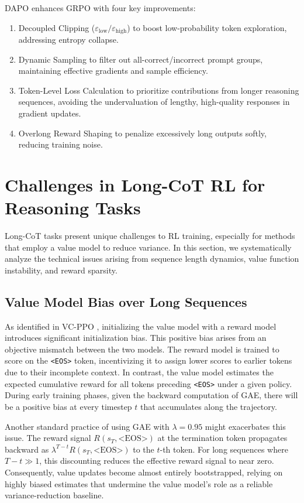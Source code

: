 DAPO enhances GRPO with four key improvements:  
\begin{enumerate}
\item  Decoupled Clipping (\(\varepsilon_{\text{low}}/\varepsilon_{\text{high}}\)) to boost low-probability token exploration, addressing entropy collapse.  
\item Dynamic Sampling to filter out all-correct/incorrect prompt groups, maintaining effective gradients and sample efficiency.  
\item  Token-Level Loss Calculation to prioritize contributions from longer reasoning sequences, avoiding the undervaluation of lengthy, high-quality responses in gradient updates.  
\item Overlong Reward Shaping to penalize excessively long outputs softly, reducing training noise.  
\end{enumerate}
\fi

\section{Challenges in Long-CoT RL for Reasoning Tasks}
Long-CoT tasks present unique challenges to RL training, especially for methods that employ a value model to reduce variance. In this section, we systematically analyze the technical issues arising from sequence length dynamics, value function instability, and reward sparsity.

\subsection{Value Model Bias over Long Sequences}
\label{challenge1}
As identified in VC-PPO \citep{vc-ppo}, initializing the value model with a reward model introduces significant initialization bias. This positive bias arises from an objective mismatch between the two models. The reward model is trained to score on the \texttt{<EOS>} token, incentivizing it to assign lower scores to earlier tokens due to their incomplete context. In contrast, the value model estimates the expected cumulative reward for all tokens preceding \texttt{<EOS>} under a given policy. During early training phases, given the backward computation of GAE, there will be a positive bias at every timestep $t$ that accumulates along the trajectory.

Another standard practice of using GAE with $\lambda=0.95$ might exacerbates this issue. The reward signal $R(s_T, \text{<EOS>})$ at the termination token propagates backward as $\lambda^{T-t} R(s_T, \text{<EOS>})$ to the $t$-th token. For long sequences where $T-t \gg 1$, this discounting reduces the effective reward signal to near zero. Consequently, value updates become almost entirely bootstrapped, relying on highly biased estimates that undermine the value model's role as a reliable variance-reduction baseline.

